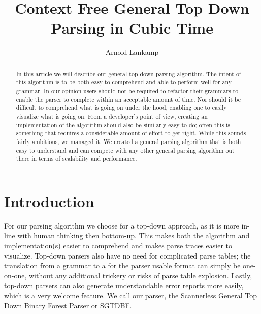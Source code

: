 \documentclass[a4paper,10pt]{article}
\title{Context Free General Top Down Parsing in Cubic Time}
\author{Arnold Lankamp}
\begin{document}
\maketitle

\begin{abstract}

In this article we will describe our general top-down parsing algorithm. The intent of this algorithm is to be both easy to comprehend and able to perform well for any grammar. In our opinion users should not be required to refactor their grammars to enable the parser to complete within an acceptable amount of time. Nor should it be difficult to comprehend what is going on under the hood, enabling one to easily visualize what is going on. From a developer's point of view, creating an implementation of the algorithm should also be similarly easy to do; often this is something that requires a considerable amount of effort to get right. While this sounds fairly ambitious, we managed it. We created a general parsing algorithm that is both easy to understand and can compete with any other general parsing algorithm out there in terms of scalability and performance.

\end{abstract}

\section{Introduction}

For our parsing algorithm we choose for a top-down approach, as it is more in-line with human thinking then bottom-up. This makes both the algorithm and implementation(s) easier to comprehend and makes parse traces easier to visualize. Top-down parsers also have no need for complicated parse tables; the translation from a grammar to a for the parser usable format can simply be one-on-one, without any additional trickery or risks of parse table explosion. Lastly, top-down parsers can also generate understandable error reports more easily, which is a very welcome feature. We call our parser, the Scannerless General Top Down Binary Forest Parser or SGTDBF.
\end{document}
